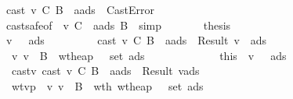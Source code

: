 \begin{isabellebody}
\ \ \ \ \ \ \ \ \ cast\ v\ C\ B{\isacharprime}\ {\isasymmu}\ {\isacharparenleft}a{\isacharhash}ads{\isacharprime}{\isacharparenright}\ {\isacharequal}\ CastError{\isachardoublequoteclose}\isanewline
\ \ \ \ \ \ \ \ \isamarkupfalse \ cast{\isacharunderscore}safe{\isacharbrackleft}of\ {\isasymSigma}\ v\ C\ {\isasymmu}\ {\isachardoublequoteopen}a{\isacharhash}ads{\isacharprime}{\isachardoublequoteclose}\ B{\isacharprime}{\isacharbrackright}\ \isamarkupfalse \ simp\isanewline
\ \ \ \ \ \ \isamarkupfalse \ {\isacharquery}thesis\isanewline
\ \ \ \ \ \ \isamarkupfalse \isanewline
\ \ \ \ \ \ \ \ \isamarkupfalse \ {\isachardoublequoteopen}{\isacharparenleft}{\isasymexists}v{\isacharprime}\ {\isasymSigma}{\isacharprime}\ {\isasymmu}{\isacharprime}\ ads{}{\isachardot}\isanewline
\ \ \ \ \ \ \ \ \ cast\ v\ C\ B{\isacharprime}\ {\isasymmu}\ {\isacharparenleft}a{\isacharhash}ads{\isacharprime}{\isacharparenright}\ {\isacharequal}\ Result\ {\isacharparenleft}v{\isacharprime}{\isacharcomma}\ {\isasymmu}{\isacharprime}{\isacharcomma}\ ads{}{\isacharparenright}\ {\isasymand}\isanewline
\ \ \ \ \ \ \ \ \ {\isasymSigma}{\isacharprime}\ {\isasymturnstile}v\ v{\isacharprime}\ {\isacharcolon}\ B{\isacharprime}\ {\isasymand}\ wt{\isacharunderscore}heap\ {\isasymSigma}{\isacharprime}\ {\isasymmu}{\isacharprime}\ {\isacharparenleft}set\ ads{}{\isacharparenright}\ {\isasymand}\ {\isasymSigma}{\isacharprime}\ {\isasymsqsubseteq}\ {\isasymSigma}{\isacharparenright}{\isachardoublequoteclose}\isanewline
\ \ \ \ \ \ \ \ \isamarkupfalse \ this\ \isamarkupfalse \ v{\isacharprime}\ {\isasymSigma}{\isacharprime}\ {\isasymmu}{\isacharprime}\ ads{}\ \isanewline
\ \ \ \ \ \ \ \ \ \ castv{\isacharcolon}\ {\isachardoublequoteopen}cast\ v\ C\ B{\isacharprime}\ {\isasymmu}\ {\isacharparenleft}a{\isacharhash}ads{\isacharprime}{\isacharparenright}\ {\isacharequal}\ Result\ {\isacharparenleft}v{\isacharprime}{\isacharcomma}{\isasymmu}{\isacharprime}{\isacharcomma}ads{}{\isacharparenright}{\isachardoublequoteclose}\ \isanewline
\ \ \ \ \ \ \ \ \ \ wtvp{\isacharcolon}\ {\isachardoublequoteopen}{\isasymSigma}{\isacharprime}\ {\isasymturnstile}v\ v{\isacharprime}\ {\isacharcolon}\ B{\isacharprime}{\isachardoublequoteclose}\ \ wth{}{\isacharcolon}\ {\isachardoublequoteopen}wt{\isacharunderscore}heap\ {\isasymSigma}{\isacharprime}\ {\isasymmu}{\isacharprime}\ {\isacharparenleft}set\ ads{}{\isacharparenright}{\isachardoublequoteclose}\ \isanewline

\end{isabellebody}
